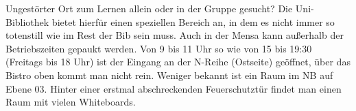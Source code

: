 Ungestörter Ort zum Lernen allein oder in der Gruppe gesucht? Die Uni-Bibliothek bietet hierfür einen speziellen Bereich an, in dem es nicht immer so totenstill wie im Rest der Bib sein muss.
Auch in der Mensa kann außerhalb der Betriebszeiten gepaukt werden. Von 9 bis 11 Uhr so wie von 15 bis 19:30 (Freitags bis 18 Uhr) ist der Eingang an der N-Reihe (Ostseite) geöffnet, über das Bistro oben kommt man nicht rein.
Weniger bekannt ist ein Raum im NB auf Ebene 03. Hinter einer erstmal abschreckenden Feuerschutztür findet man einen Raum mit vielen Whiteboards.
